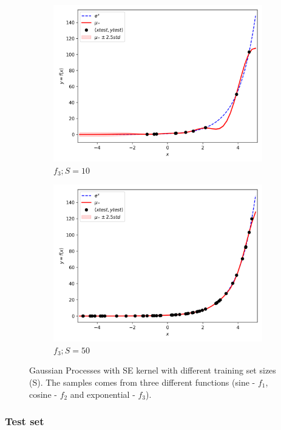 \documentclass{article}
\begin{document}
\begin{figure}
\begin{subfigure}{.33\textwidth}
  \includegraphics[width=\linewidth]{train_size/func3_10.png}
  \caption{$f_3; S = 10$}
\end{subfigure}
\begin{subfigure}{.33\textwidth}
  \centering
  \includegraphics[width=\linewidth]{train_size/func3_50.png}
  \caption{$f_3; S = 50$}
\end{subfigure}
\caption{Gaussian Processes with SE kernel with different training set sizes (S). The samples comes from three different functions (sine - $f_1$, cosine - $f_2$ and exponential - $f_3$).}
\label{fig:train_samples}
\end{figure}

\subsubsection{Test set}
\end{document}
